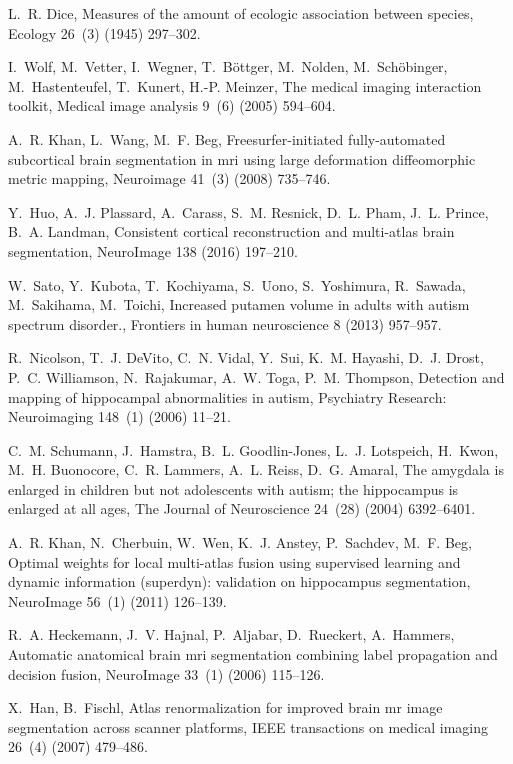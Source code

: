 \documentclass[twoside,fleqn,espcrc2]{elsarticle}
\begin{document}
\begin{thebibliography}{10}
L.~R. Dice, Measures of the amount of ecologic association between species,
  Ecology 26~(3) (1945) 297--302.

I.~Wolf, M.~Vetter, I.~Wegner, T.~B{\"o}ttger, M.~Nolden, M.~Sch{\"o}binger,
  M.~Hastenteufel, T.~Kunert, H.-P. Meinzer, The medical imaging interaction
  toolkit, Medical image analysis 9~(6) (2005) 594--604.

A.~R. Khan, L.~Wang, M.~F. Beg, Freesurfer-initiated fully-automated
  subcortical brain segmentation in mri using large deformation diffeomorphic
  metric mapping, Neuroimage 41~(3) (2008) 735--746.

Y.~Huo, A.~J. Plassard, A.~Carass, S.~M. Resnick, D.~L. Pham, J.~L. Prince,
  B.~A. Landman, Consistent cortical reconstruction and multi-atlas brain
  segmentation, NeuroImage 138 (2016) 197--210.

W.~Sato, Y.~Kubota, T.~Kochiyama, S.~Uono, S.~Yoshimura, R.~Sawada,
  M.~Sakihama, M.~Toichi, Increased putamen volume in adults with autism
  spectrum disorder., Frontiers in human neuroscience 8 (2013) 957--957.

R.~Nicolson, T.~J. DeVito, C.~N. Vidal, Y.~Sui, K.~M. Hayashi, D.~J. Drost,
  P.~C. Williamson, N.~Rajakumar, A.~W. Toga, P.~M. Thompson, Detection and
  mapping of hippocampal abnormalities in autism, Psychiatry Research:
  Neuroimaging 148~(1) (2006) 11--21.

C.~M. Schumann, J.~Hamstra, B.~L. Goodlin-Jones, L.~J. Lotspeich, H.~Kwon,
  M.~H. Buonocore, C.~R. Lammers, A.~L. Reiss, D.~G. Amaral, The amygdala is
  enlarged in children but not adolescents with autism; the hippocampus is
  enlarged at all ages, The Journal of Neuroscience 24~(28) (2004) 6392--6401.

A.~R. Khan, N.~Cherbuin, W.~Wen, K.~J. Anstey, P.~Sachdev, M.~F. Beg, Optimal
  weights for local multi-atlas fusion using supervised learning and dynamic
  information (superdyn): validation on hippocampus segmentation, NeuroImage
  56~(1) (2011) 126--139.

R.~A. Heckemann, J.~V. Hajnal, P.~Aljabar, D.~Rueckert, A.~Hammers, Automatic
  anatomical brain mri segmentation combining label propagation and decision
  fusion, NeuroImage 33~(1) (2006) 115--126.

X.~Han, B.~Fischl, Atlas renormalization for improved brain mr image
  segmentation across scanner platforms, IEEE transactions on medical imaging
  26~(4) (2007) 479--486.


\end{thebibliography}
\end{document}
